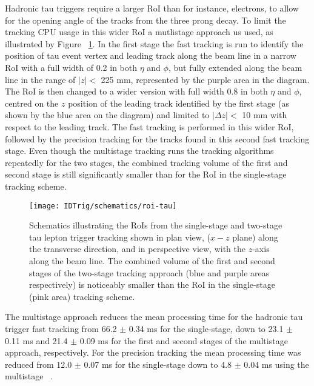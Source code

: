 	Hadronic tau triggers require a larger \ac{RoI} than for instance, electrons, to allow for the opening angle of the tracks from the three prong decay. To limit the tracking \ac{CPU} usage in this wider \ac{RoI} a mutlistage approach us used, as illustrated by Figure ~\ref{fig:roi_tau}. 
	In the first stage the fast tracking is run to identify the position of tau event vertex and leading track along the beam line in a narrow \ac{RoI} with a full width of 0.2 in both $\eta$ and $\phi$, but fully extended along the beam line in the range of $|z|<$ 225 mm, represented by the purple area in the diagram. The \ac{RoI} is then changed to a wider version with full width 0.8 in both $\eta$ and $\phi$, centred on the $z$ position of the leading track identified by the first stage (as shown by the blue area on the diagram) and limited to $|\Delta z|<$ 10 mm with respect to the leading track. The fast tracking is performed in this wider \ac{RoI}, followed by the precision tracking for the tracks found in this second fast tracking stage. Even though the multistage tracking runs the tracking algorithms repeatedly for the two stages, the combined tracking volume of the first and second stage is still significantly smaller than for the \ac{RoI} in the single-stage tracking scheme. 
	\begin{figure}[!hbt]
	\centering
	\texttt{[image: IDTrig/schematics/roi-tau]}
	\caption{Schematics illustrating the \ac{RoI}s from the single-stage and two-stage tau lepton trigger tracking shown in plan view, ($x-z$ plane) along the transverse direction, and in perspective view, with the $z$-axis along the beam line. The combined volume of the first and second stages of the two-stage tracking approach (blue and purple areas respectively) is noticeably smaller than the \ac{RoI} in the single-stage (pink area) tracking scheme.}
	\label{fig:roi_tau}
	\end{figure} 

The multistage approach reduces the mean processing time for the hadronic tau trigger fast tracking from 66.2 $\pm$ 0.34 ms for the single-stage, down to 23.1 $\pm$ 0.11 ms and 21.4 $\pm$ 0.09 ms for the first and second stages of the multistage approach, respectively. For the precision tracking the mean processing time was reduced from 12.0 $\pm$ 0.07 ms for the single-stage down to 4.8 $\pm$ 0.04 ms using the multistage ~\cite{Sutton:2695048}.

